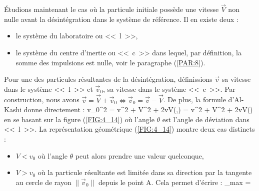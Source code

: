 \'Etudions maintenant le cas o\`u la particule initiale poss\`ede une vitesse $\vec{V}$ non nulle avant la d\'esint\'egration dans le syst\`eme de r\'ef\'erence. Il en existe deux :
\begin{itemize}
	\item le syst\`eme du laboratoire ou <<~l~>>,
	\item le syst\`eme du centre d'inertie ou <<~c~>> dans lequel, par d\'efinition, la somme des impulsions est nulle, voir le paragraphe (\ref{PAR:8}).
\end{itemize}
Pour une des particules r\'esultantes de la d\'esint\'egration, d\'efinissions $\vec{v}$ sa vitesse dans le syst\`eme <<~l~>> et $\vec{v}_{0}$, sa vitesse dans le syst\`eme <<~c~>>. Par construction, nous avons $\vec{v} = \vec{V} + \vec{v}_{0} \Leftrightarrow \vec{v}_{0} = \vec{v} - \vec{V}$. De plus, la formule d'Al-Kashi donne directement :
\benn
	v_{0}^{2} = v^{2} + V^{2} + 2vV\cos(\langle {},\rangle) = v^{2} + V^{2} + 2vV\cos(\theta)
\eenn
en se basant sur la figure (\ref{FIG:4_14}) o\`u l'angle $\theta$ est l'angle de d\'eviation dans <<~l~>>. La repr\'esentation g\'eom\'etrique (\ref{FIG:4_14}) montre deux cas distincts :
\begin{itemize}
	\item $V < v_{0}$ o\`u l'angle $\theta$ peut alors prendre une valeur quelconque,
	\item $V > v_{0}$ o\`u la particule r\'esultante est limit\'ee dans sa direction par la tangente au cercle de rayon $\lVert \vec{v}_{0} \rVert$ depuis le point A. Cela permet d'\'ecrire :
	\be
		\sin\theta_{max} =  \label{EQ:16_4}
	\ee
\end{itemize}

